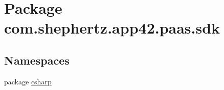 \hypertarget{namespacecom_1_1shephertz_1_1app42_1_1paas_1_1sdk}{\section{Package com.\+shephertz.\+app42.\+paas.\+sdk}
\label{namespacecom_1_1shephertz_1_1app42_1_1paas_1_1sdk}
}
\subsection*{Namespaces}
\begin{DoxyCompactItemize}
\item 
package \hyperlink{namespacecom_1_1shephertz_1_1app42_1_1paas_1_1sdk_1_1csharp}{csharp}
\end{DoxyCompactItemize}
